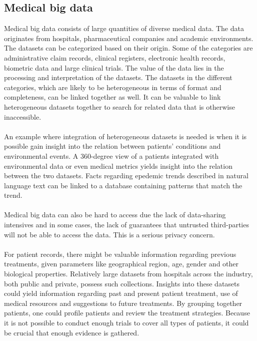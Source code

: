 \subsection{Medical big data}
Medical big data consists of large quantities of diverse medical data. The data originates from hospitals, pharmaceutical companies and academic environments. The datasets can be categorized based on their origin. Some of the categories are administrative claim records, clinical registers, electronic health records, biometric data and large clinical trials. The value of the data lies in the processing and interpretation of the datasets. The datasets in the different categories, which are likely to be heterogeneous in terms of format and completeness, can be linked together as well. It can be valuable to link heterogeneous datasets together to search for related data that is otherwise inaccessible.\cite{wp}
\\\\
An example where integration of heterogeneous datasets is needed is when it is possible gain insight into the relation between patients' conditions and environmental events. A 360-degree view of a patients integrated with environmental data or even medical metrics yields insight into the relation between the two datasets. Facts regarding epedemic trends described in natural language text can be linked to a database containing patterns that match the trend. \cite{integration}
\\\\
Medical big data can also be hard to access due the lack of data-sharing intensives and in some cases, the lack of guarantees that untrusted third-parties will not be able to access the data. This is a serious privacy concern. 
\\\\
For patient records, there might be valuable information regarding previous treatments, given parameters like geographical region, age, gender and other biological properties. Relatively large datasets from hospitals across the industry, both public and private, possess such collections. Insights into these datasets could yield information regarding past and present patient treatment, use of medical resources and suggestions to future treatments. By grouping together patients, one could profile patients and review the treatment strategies. Because it is not possible to conduct enough trials to cover all types of patients, it could be crucial that enough evidence is gathered. \cite{mbd3}
\\\\
